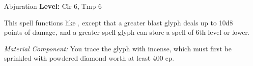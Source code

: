 {Abjuration}
{
	\textbf{Level:}
	Clr 6, Tmp 6\\
}
{
	This spell functions like , except that a greater blast glyph deals up to 10d8 points of damage, and a greater spell glyph can store a spell of 6th level or lower.

	\textit{Material Component:}
	You trace the glyph with incense, which must first be sprinkled with powdered diamond worth at least 400 cp.

}

